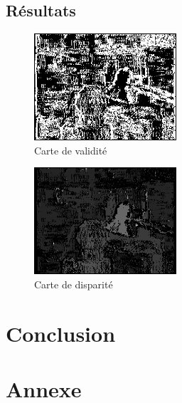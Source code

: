 \documentclass[a4paper]{article}
\begin{document}
\subsection{Résultats}

\begin{figure}[h]
\begin{center}
	\includegraphics[width=200px]{validity-mask.png}
\end{center}
\caption{Carte de validité}
\end{figure}

\begin{figure}[h]
\begin{center}
	\includegraphics[width=200px]{disparity_resampled.png}
\end{center}
\caption{Carte de disparité}
\end{figure}

\clearpage


\section{Conclusion}

\clearpage

\section{Annexe}
\end{document}
